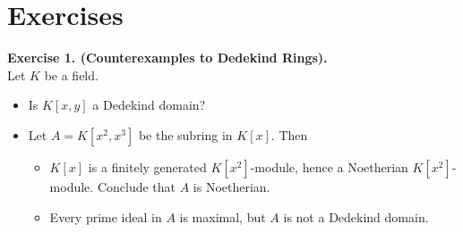 \documentclass[12pt,a4paper,footinclude=true,headinclude=true]{scrbook} %
\newenvironment{exe}[2][Exercise]
    { \begin{mdframed}[backgroundcolor=gray!20] \textbf{#1 #2.}\\ }
    {  \end{mdframed}}
\begin{document}
\newpage
\section{Exercises}
\begin{exe}{1. (Counterexamples to Dedekind Rings)}
    Let $K$ be a field.
    \begin{itemize}
        \item[(a)] Is $K[x,y]$ a Dedekind domain?
        \item[(b)] Let $A=K[x^2,x^3]$ be the subring in $K[x]$. Then
        \begin{itemize}[$\bullet$]
            \item $K[x]$ is a finitely generated $K[x^2]$-module, hence a Noetherian $K[x^2]$-module. Conclude that $A$ is Noetherian.
            \item Every prime ideal in $A$ is maximal, but $A$ is not a Dedekind domain.
        \end{itemize}
    \end{itemize}
\end{exe}
\end{document}
